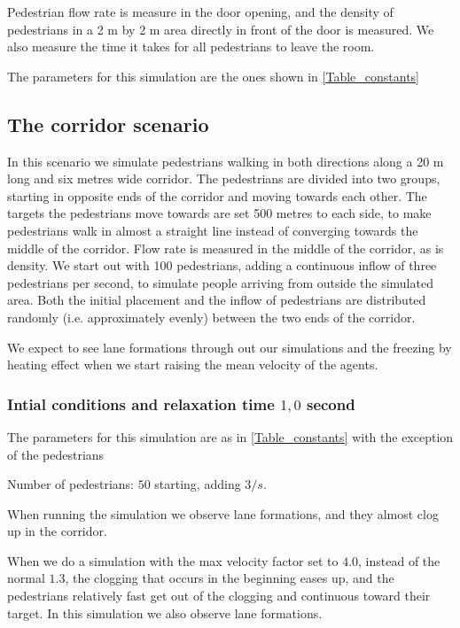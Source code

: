 Pedestrian flow rate is measure in the door opening, and the density of pedestrians in a 2 m by 2 m area directly in front of the door is measured. We also measure the time it takes for all pedestrians to leave the room.

The parameters for this simulation are the ones shown in \ref{Table_constants}



\subsection{The corridor scenario}
In this scenario we simulate pedestrians walking in both directions along a 20 
m long and six metres wide corridor. The pedestrians are divided into two 
groups, starting in opposite ends of the corridor and moving towards each 
other. The targets the pedestrians move towards are set 500 metres to each 
side, to make pedestrians walk in almost a straight line instead of converging 
towards the middle of the corridor. Flow rate is measured in the middle of the 
corridor, as is density. We start out with 100 pedestrians, adding a 
continuous inflow of three pedestrians per second, to simulate people arriving 
from outside the simulated area. Both the initial placement and the inflow of 
pedestrians are distributed randomly (i.e. approximately evenly) between the 
two ends of the corridor.

We expect to see lane formations through out our simulations
and the freezing by heating effect when we start raising the mean velocity
of the agents.

\subsubsection{Intial conditions and relaxation time $1,0$ second}

The parameters for this simulation are as in \ref{Table_constants} with the exception of the pedestrians
\begin{itemize*}
    \item Number of pedestrians: $50$ starting, adding $3/s$.
\end{itemize*}

When running the simulation we observe lane formations, and they almost clog up
in the corridor.

When we do a simulation with the max velocity factor set to $4.0$, instead of the normal $1.3$, the clogging
that occurs in the beginning eases up, and the pedestrians relatively fast
get out of the clogging and continuous toward their target. In this simulation
we also observe lane formations.

